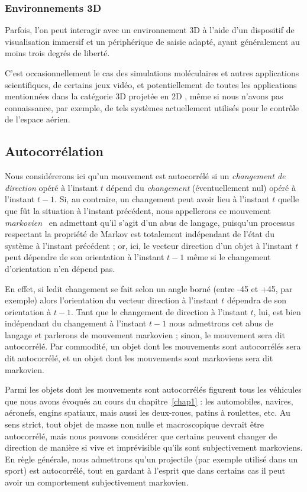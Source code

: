 	\subsubsection{Environnements 3D}
	Parfois, l'on peut interagir avec un environnement 3D à l'aide d'un dispositif de visualisation immersif et un périphérique de saisie adapté, ayant généralement au moins trois degrés de liberté.
	
	C'est occasionnellement le cas des simulations moléculaires et autres applications scientifiques, de certains jeux vidéo, et potentiellement de toutes les applications mentionnées dans la catégorie \og 3D projetée en 2D \fg{}, même si nous n'avons pas connaissance, par exemple, de tels systèmes actuellement utilisés pour le contrôle de l'espace aérien.

	\subsection{Autocorrélation}
	Nous considérerons ici qu'un mouvement est autocorrélé si un \emph{changement de direction} opéré à l'instant $t$ dépend du \emph{changement} (éventuellement nul) opéré à l'instant $t-1$. Si, au contraire, un changement peut avoir lieu à l'instant $t$ quelle que fût la situation à l'instant précédent, nous appellerons ce mouvement \emph{markovien}~\cite{markov1960theory} en admettant qu'il s'agit d'un abus de langage, puisqu'un processus respectant la propriété de Markov est totalement indépendant de l'état du système à l'instant précédent ; or, ici, le vecteur direction d'un objet à l'instant $t$ peut dépendre de son orientation à l'instant $t-1$ même si le changement d'orientation n'en dépend pas.
	
	En effet, si ledit changement se fait selon un angle borné (entre -45\textdegree{} et +45\textdegree{}, par exemple) alors l'orientation du vecteur direction à l'instant $t$ dépendra de son orientation à $t-1$. Tant que le changement de direction à l'instant $t$, lui, est bien indépendant du changement à l'instant $t-1$ nous admettrons cet abus de langage et parlerons de mouvement markovien ; sinon, le mouvement sera dit autocorrélé. Par commodité, un objet dont les mouvements sont autocorrélés sera dit autocorrélé, et un objet dont les mouvements sont markoviens sera dit markovien.

	Parmi les objets dont les mouvements sont autocorrélés figurent tous les véhicules que nous avons évoqués au cours du chapitre~\ref{chap1} : les automobiles, navires, aéronefs, engins spatiaux, mais aussi les deux-roues, patins à roulettes, etc. Au sens strict, tout objet de masse non nulle et macroscopique devrait être autocorrélé, mais nous pouvons considérer que certains peuvent changer de direction de manière si vive et imprévisible qu'ils sont subjectivement markoviens. En règle générale, nous admettrons qu'un projectile (par exemple utilisé dans un sport) est autocorrélé, tout en gardant à l'esprit que dans certains cas il peut avoir un comportement subjectivement markovien.
	
